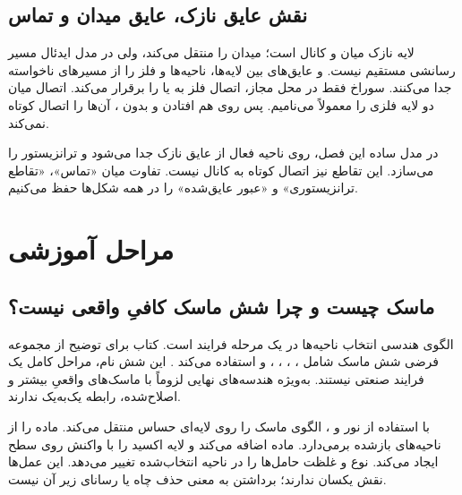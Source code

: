 \subsection{نقش عایق نازک، عایق میدان و تماس}
 لایه نازک میان  و کانال است؛ میدان را منتقل
می‌کند، ولی در مدل ایدئال مسیر رسانشی مستقیم نیست.
 و عایق‌های بین لایه‌ها، ناحیه‌ها و فلز را از مسیرهای
ناخواسته جدا می‌کنند. سوراخ  فقط در محل مجاز، اتصال فلز به
 یا  را برقرار می‌کند.
اتصال میان دو لایه فلزی را معمولاً  می‌نامیم.
پس روی هم افتادن  و  بدون ، آن‌ها را اتصال کوتاه نمی‌کند.

در مدل ساده این فصل،  روی ناحیه فعال از عایق نازک جدا می‌شود و
ترانزیستور را می‌سازد. این تقاطع نیز اتصال کوتاه  به کانال نیست.
تفاوت میان «تماس»، «تقاطع ترانزیستوری» و «عبور عایق‌شده» را در همه شکل‌ها حفظ می‌کنیم.

\section{مراحل آموزشی }
\label{sec:layout-fabrication}
\subsection{ماسک چیست و چرا شش ماسک کافیِ واقعی نیست؟}
 الگوی هندسی انتخاب ناحیه‌ها در یک مرحله فرایند است.
کتاب برای توضیح  از مجموعه فرضی شش ماسک شامل
، ، ، ،
 و  استفاده می‌کند
\cite[بخش  و شکل ]{weste}.
این شش نام، مراحل کامل یک فرایند صنعتی نیستند.
به‌ویژه هندسه‌های نهایی  لزوماً با ماسک‌های واقعیِ بیشتر و اصلاح‌شده،
رابطه یک‌به‌یک ندارند.

 با استفاده از نور و ، الگوی ماسک
را روی لایه‌ای حساس منتقل می‌کند.  ماده را از ناحیه‌های بازشده
برمی‌دارد.  ماده اضافه می‌کند و  لایه اکسید را
با واکنش روی سطح ایجاد می‌کند.  نوع و غلظت حامل‌ها را در ناحیه انتخاب‌شده تغییر می‌دهد.
این عمل‌ها نقش یکسان ندارند؛ برداشتن  به معنی حذف چاه یا رسانای زیر آن نیست.

